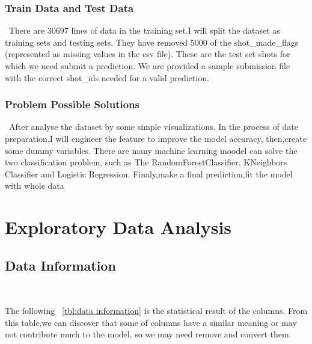 \subsubsection{Train Data and Test Data}
\
There are 30697 lines of data in the training set.I will split the dataset as training sets and testing sets.
They have removed 5000 of the shot_made_flags (represented as missing values in the csv file). 
These are the test set shots for which we need submit a prediction. We are provided
a sample submission file with the correct shot_ids needed for a valid prediction.


\subsubsection{Problem Possible Solutions}
\
After analyse the dataset by some simple visualizations.
In the process of date preparation,I will engineer the feature to improve the model accuracy,
then,create some dummy variables.
There are many machine learning moodel
can solve the two classification problem,
such as The RandomForestClassifier,
KNeighbors Classifier and Logistic Regression.
Finaly,make a final prediction,fit the model with whole data





\section{Exploratory Data Analysis} \label{sec-data_exploration}

\subsection{Data Information}
\

The following  ~\cref{tbl:data information}
is the statistical result of the columns.
From this table,we can discover that some of columns have a similar meaning 
or may not contribute much to the model.
so we may need remove and convert them. 

